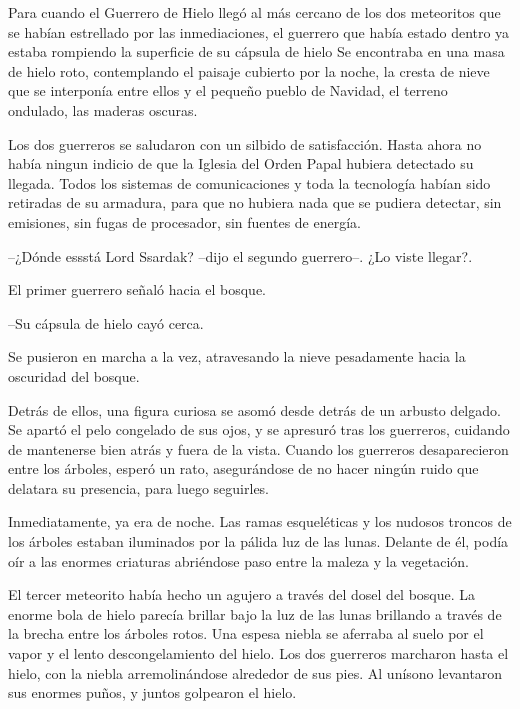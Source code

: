 Para cuando el Guerrero de Hielo llegó al más cercano de los dos meteoritos que se habían estrellado por las inmediaciones, el guerrero que había estado dentro ya estaba rompiendo la superficie de su cápsula de hielo Se encontraba en una masa de hielo roto, contemplando el paisaje cubierto por la noche, la cresta de nieve que se interponía entre ellos y el pequeño pueblo de Navidad, el terreno ondulado, las maderas oscuras.



Los dos guerreros se saludaron con un silbido de satisfacción. Hasta ahora no había ningun indicio de que la Iglesia del Orden Papal hubiera detectado su llegada. Todos los sistemas de comunicaciones y toda la tecnología habían sido retiradas de su armadura, para que no hubiera nada que se pudiera detectar, sin emisiones, sin fugas de procesador, sin fuentes de energía.



--¿Dónde essstá Lord Ssardak? --dijo el segundo guerrero--. ¿Lo viste llegar?.



El primer guerrero señaló hacia el bosque. 


--Su cápsula de hielo cayó cerca.



Se pusieron en marcha a la vez, atravesando la nieve pesadamente hacia la oscuridad del bosque.



Detrás de ellos, una figura curiosa se asomó desde detrás de un arbusto delgado. Se apartó el pelo congelado de sus ojos, y se apresuró tras los guerreros, cuidando de mantenerse bien atrás y fuera de la vista. Cuando los guerreros desaparecieron entre los árboles, esperó un rato, asegurándose de no hacer ningún ruido que delatara su presencia, para luego seguirles.



Inmediatamente, ya era de noche. Las ramas esqueléticas y los nudosos troncos de los árboles estaban iluminados por la pálida luz de las lunas. Delante de él, podía oír a las enormes criaturas abriéndose paso entre la maleza y la vegetación.



\mbox{}



El tercer meteorito había hecho un agujero a través del dosel del bosque. La enorme bola de hielo parecía brillar bajo la luz de las lunas brillando a través de la brecha entre los árboles rotos. Una espesa niebla se aferraba al suelo por el vapor y el lento descongelamiento del hielo. Los dos guerreros marcharon hasta el hielo, con la niebla arremolinándose alrededor de sus pies. Al unísono levantaron sus enormes puños, y juntos golpearon el hielo.



